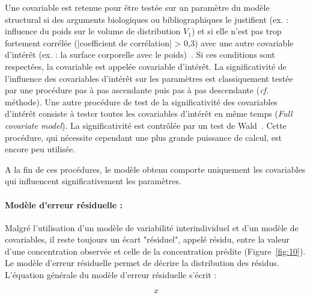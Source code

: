 Une covariable est retenue pour être testée sur un paramètre du modèle structural si des arguments biologiques ou bibliographiques le justifient (ex. : influence du poids sur le volume de distribution $V_1$) et si elle n'est pas trop fortement corrélée (|coefficient de corrélation| > 0,3) avec une autre covariable d'intérêt (ex. : la surface corporelle avec le poids)~\citep{REF11}. Si ces conditions sont respectées, la covariable est appelée covariable d'intérêt. La significativité de l'influence des covariables d'intérêt sur les paramètres est classiquement testée par une procédure pas à pas ascendante puis pas à pas descendante (\textit{cf.} méthode). Une autre procédure de test de la significativité des covariables d'intérêt consiste à tester toutes les covariables d'intérêt en même temps (\textit{Full covariate model}). La significativité est contrôlée par un test de Wald~\citep{REF12}. Cette procédure, qui nécessite cependant une plus grande puissance de calcul, est encore peu utilisée.

A la fin de ces procédures, le modèle obtenu comporte uniquement les covariables qui influencent significativement les paramètres.

\paragraph*{Modèle d'erreur résiduelle :} Malgré l'utilisation d'un modèle de variabilité interindividuel et d'un modèle de covariables, il reste toujours un écart "résiduel", appelé résidu, entre la valeur d'une concentration observée et celle de la concentration prédite (Figure~\ref{fig:10}). Le modèle d'erreur résiduelle permet de décrire la distribution des résidus. L'équation générale du modèle d'erreur résiduelle s'écrit :

\begin{equation}
x
\label{eq:49}
\end{equation}

